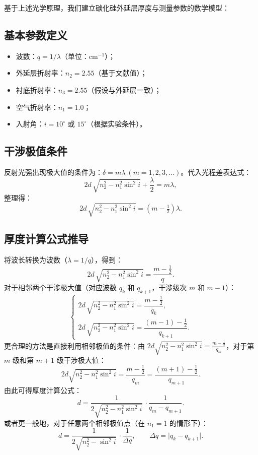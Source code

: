\documentclass{ctexart} %
\begin{document}
基于上述光学原理，我们建立碳化硅外延层厚度与测量参数的数学模型：

\subsection{基本参数定义}
\begin{itemize}
    \item 波数：\(q = 1/\lambda\)（单位：cm\(^{-1}\)）；
    \item 外延层折射率：\(n_2 = 2.55\)（基于文献值）；
    \item 衬底折射率：\(n_3 = 2.55\)（假设与外延层一致）；
    \item 空气折射率：\(n_1 = 1.0\)；
    \item 入射角：\(i = 10^\circ\) 或 \(15^\circ\)（根据实验条件）。
\end{itemize}

\subsection{干涉极值条件}
反射光强出现极大值的条件为：\(\delta = m\lambda\ (m = 1,2,3,\ldots)\)。代入光程差表达式：
\[
    2d\, \sqrt{n_2^2 - n_1^2 \sin^2 i} + \frac{\lambda}{2} = m\lambda,
\]
整理得：
\[
    2d\, \sqrt{n_2^2 - n_1^2 \sin^2 i} = \left(m - \tfrac{1}{2}\right)\lambda.
\]

\subsection{厚度计算公式推导}
将波长转换为波数（\(\lambda = 1/q\)），得到：
\[
    2d\, \sqrt{n_2^2 - n_1^2 \sin^2 i} = \frac{m - \tfrac{1}{2}}{q}.
\]
对于相邻两个干涉极大值（对应波数 \(q_k\) 和 \(q_{k+1}\)，干涉级次 \(m\) 和 \(m-1\)）：
\[
    \begin{cases}
        2d\, \sqrt{n_2^2 - n_1^2 \sin^2 i} = \dfrac{m - \tfrac{1}{2}}{q_k}, \\
        2d\, \sqrt{n_2^2 - n_1^2 \sin^2 i} = \dfrac{(m-1) - \tfrac{1}{2}}{q_{k+1}}.
    \end{cases}
\]
更合理的方法是直接利用相邻极值的条件：由 \(2d \sqrt{n_2^2 - n_1^2 \sin^2 i} = \frac{m - \tfrac{1}{2}}{q_m}\)，对于第 \(m\) 级和第 \(m+1\) 级干涉极大值：
\[
    2d \sqrt{n_2^2 - n_1^2 \sin^2 i} = \frac{m - \tfrac{1}{2}}{q_m} = \frac{(m+1) - \tfrac{1}{2}}{q_{m+1}}.
\]
由此可得厚度计算公式：
\[
    d = \frac{1}{2\sqrt{n_2^2 - n_1^2 \sin^2 i}}\, \cdot \frac{1}{q_m - q_{m+1}}.
\]
或者更一般地，对于任意两个相邻极值点（在 \(n_1=1\) 的情形下）：
\[
    d = \frac{1}{2\sqrt{n_2^2 - \sin^2 i}}\, \cdot \frac{1}{\Delta q},\qquad \Delta q = \lvert q_k - q_{k+1} \rvert.
\]
\end{document}
